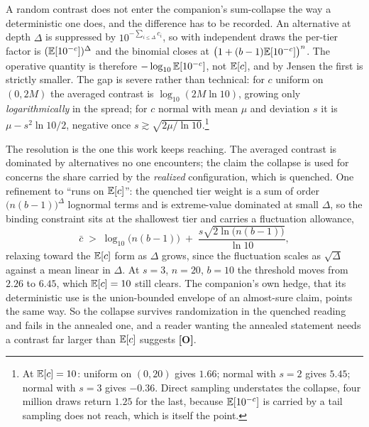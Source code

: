 \begin{remark}\label{sch:rem:n2}
A random contrast does not enter the companion's sum-collapse the way a
deterministic one does, and the difference has to be recorded. An alternative at depth $\Delta$ is suppressed by
$10^{-\sum_{i\le\Delta}c_i}$, so with independent draws the per-tier
factor is $(\mathbb{E}[10^{-c}])^{\Delta}$ and the binomial closes at
$\bigl(1+(b-1)\mathbb{E}[10^{-c}]\bigr)^{n}$. The operative quantity is
therefore $-\log_{10}\mathbb{E}[10^{-c}]$, not $\mathbb{E}[c]$, and by Jensen the first
is strictly smaller. The gap is severe rather than technical: for $c$
uniform on $(0,2M)$ the averaged contrast is $\log_{10}(2M\ln10)$,
growing only \emph{logarithmically} in the spread; for $c$ normal with
mean $\mu$ and deviation $s$ it is $\mu-s^{2}\ln10/2$, negative once
$s\gtrsim\sqrt{2\mu/\ln10}$.\footnote{At $\mathbb{E}[c]=10$: uniform on
$(0,20)$ gives $1.66$; normal with $s=2$ gives $5.45$; normal with $s=3$
gives $-0.36$. Direct sampling understates the collapse, four million
draws return $1.25$ for the last, because $\mathbb{E}[10^{-c}]$ is carried by
a tail sampling does not reach, which is itself the point.}

The resolution is the one this work keeps reaching. The averaged
contrast is dominated by alternatives no one encounters; the claim the
collapse is used for concerns the share carried by the \emph{realized}
configuration, which is quenched. One refinement to ``runs on $\mathbb{E}[c]$'':
the quenched tier weight is a sum of order $\bigl(n(b-1)\bigr)^{\Delta}$
lognormal terms and is extreme-value dominated at small $\Delta$, so the
binding constraint sits at the shallowest tier and carries a fluctuation
allowance,
\begin{equation}\label{sch:eq:quenchedcrit}
\bar c\;>\;\log_{10}\bigl(n(b-1)\bigr)
\;+\;\frac{s\sqrt{2\ln\bigl(n(b-1)\bigr)}}{\ln10},
\end{equation}
relaxing toward the $\mathbb{E}[c]$ form as $\Delta$ grows, since the fluctuation
scales as $\sqrt\Delta$ against a mean linear in $\Delta$. At $s=3$,
$n=20$, $b=10$ the threshold moves from $2.26$ to $6.45$, which
$\mathbb{E}[c]=10$ still clears. The companion's
own hedge, that its deterministic use is the union-bounded envelope
of an almost-sure claim, points the same way. So the collapse
survives randomization in the quenched reading and fails in the annealed
one, and a reader wanting the annealed statement needs a contrast far
larger than $\mathbb{E}[c]$ suggests \textbf{[O]}.
\end{remark}

